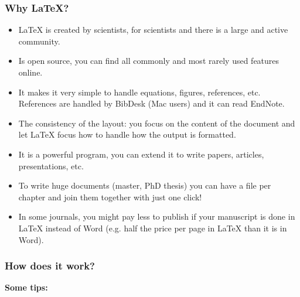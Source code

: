 \begin{frame}[fragile]
\frametitle{Why \LaTeX?}
\begin{itemize}
\item \LaTeX{} is created by scientists, for scientists and there is a large and active community. \\
\pause
\item Is open source, you can find all commonly and most rarely used features online. \\
\pause
\item It makes it very simple to handle equations, figures, references, etc. References are handled by BibDesk (Mac users) and it can read EndNote. \\
\pause
\item The consistency of the layout: you focus on the content of the document and let \LaTeX{} focus how to handle how the output is formatted.\\
\pause
\item It is a powerful program, you can extend it to write papers, articles, presentations, etc.\\
\pause
\item To write huge documents (master, PhD thesis) you can have a file per chapter and join them together with just one click!\\
\pause
\item In some journals, you might pay less to publish if your manuscript is done in \LaTeX{} instead of Word (e.g. half the price per page in \LaTeX{} than it is in Word).
\end{itemize}
\end{frame}


\begin{frame}[fragile]
\frametitle{How does it work?}
\pause
\textbf{Some tips:} 
\end{frame}

